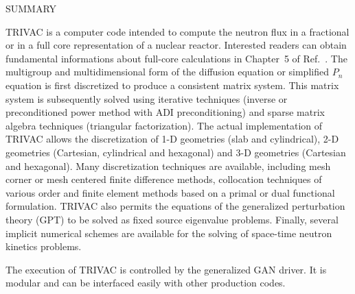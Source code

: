 \clearpage
$ $
\vskip 2.0cm

\begin{center}

SUMMARY

\end{center}

TRIVAC is a computer code intended to compute the neutron flux in a 
fractional or in a full core representation of a nuclear reactor. Interested readers
can obtain fundamental informations about full-core calculations in Chapter~5
of Ref.~. The multigroup
and multidimensional form of the diffusion equation or simplified $P_n$ equation
is first discretized to
produce a consistent matrix system. This matrix system is subsequently solved
using iterative techniques (inverse or preconditioned power method with
ADI preconditioning) and sparse matrix algebra techniques
(triangular factorization). The actual implementation of TRIVAC allows the
discretization of 1-D geometries (slab and cylindrical), 2-D geometries
(Cartesian, cylindrical and hexagonal) and 3-D geometries (Cartesian and
hexagonal). Many discretization techniques are available, including mesh corner
or mesh centered finite difference methods, collocation techniques of various
order and finite element methods based on a primal or dual functional
formulation. TRIVAC also permits  the equations of the generalized
perturbation theory (GPT) to be solved as fixed source eigenvalue problems.
Finally, several implicit numerical schemes are available for the solving of space-time
neutron kinetics problems.

\vskip 0.15cm

The execution of TRIVAC is controlled by the generalized GAN driver.\cite{utilitaire} It is
modular and can be interfaced easily with other production codes.
